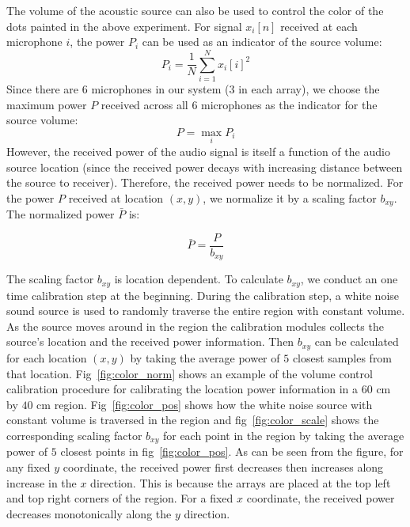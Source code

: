 The volume of the acoustic source can also be used to control the color of the dots painted in the above experiment. For signal $x_i[n]$ received at each microphone $i$, the power $P_i$ can be used as an indicator of the source volume:
\[
P_i = \frac{1}{N} \sum_{i=1}^N x_i[i]^2
\]
Since there are $6$ microphones in our system ($3$ in each array), we choose the maximum power $P$ received across all $6$ microphones as the indicator for the source volume:
\[
P = \max_i P_i 
\]
However, the received power of the audio signal is itself a function of the audio source location (since the received power decays with increasing distance between the source to receiver). Therefore, the received power needs to be normalized. For the power $P$ received at location $(x,y)$, we normalize it by a scaling factor $b_{xy}$. The normalized power $\bar{P}$ is:

\[
\bar{P} = \frac{P}{b_{xy}}
\]

The scaling factor $b_{xy}$ is location dependent. To calculate $b_{xy}$, we conduct an one time calibration step at the beginning. During the calibration step, a white noise sound source is used to randomly traverse the entire region with constant volume. As the source moves around in the region the calibration modules collects the source's location and the received power information. Then $b_{xy}$ can be calculated for each location $(x,y)$  by taking the average power of $5$ closest samples from that location. Fig~\ref{fig:color_norm} shows an example of the volume control calibration procedure for calibrating the location power information in a $60$ cm by $40$ cm region. Fig~\ref{fig:color_pos} shows how the white noise source with constant volume is traversed in the region and fig~\ref{fig:color_scale} shows the corresponding scaling factor $b_{xy}$ for each point in the region by taking the average power of $5$ closest points in fig~\ref{fig:color_pos}. As can be seen from the figure, for any fixed $y$ coordinate, the received power first decreases then increases along increase in the $x$ direction. This is because the arrays are placed at the top left and top right corners of the region. For a fixed $x$ coordinate, the received power decreases monotonically along the $y$ direction.

